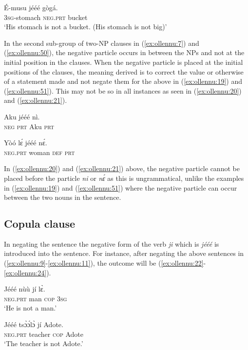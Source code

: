 \documentclass[output=paper,newtxmath,modfonts,nonflat,draftmode]{langsci/langscibook}
\begin{document}
\ea \label{ex:ollennu:51}
\gll É-musu jééé gògá.\\
3\textsc{sg}-stomach \textsc{neg}.\textsc{prt} bucket\\
\glt 	`His stomach is not a bucket. (His stomach is not big)'
\z


In the second sub-group of two-NP clauses in (\ref{ex:ollennu:7}) and (\ref{ex:ollennu:50}), the {negative particle} occurs in between the NPs and not at the initial position in the clauses. When the {negative particle} is placed at the initial positions of the clauses, the meaning derived is to correct the value or otherwise of a statement made and not negate them for the above in (\ref{ex:ollennu:19}) and (\ref{ex:ollennu:51}). This may not be so in all instances as seen in (\ref{ex:ollennu:20}) and (\ref{ex:ollennu:21}).

\ea \label{ex:ollennu:20}
\gll * Aku jééé nì. \\
{} \textsc{neg} \textsc{prt} Aku \textsc{prt}\\
\z

\ea \label{ex:ollennu:21}
\gll * Yòó l\'ɛ jééé n\'ɛ.\\
{} \textsc{neg}.\textsc{prt} woman \textsc{def} \textsc{prt}\\
\z


In (\ref{ex:ollennu:20}) and (\ref{ex:ollennu:21}) above, the {negative particle} cannot be placed before the particle \textit{ni} or \textit{n\'ɛ} as this is ungrammatical, unlike the examples in (\ref{ex:ollennu:19}) and (\ref{ex:ollennu:51}) where the {negative particle} can occur between the two nouns in the sentence.

\subsection{\label{sec:ollennu:2.2} Copula clause}

In negating the  sentence the negative form of the  verb \textit{ji} which is \textit{jééé} is introduced into the sentence. For instance, after negating the above  sentences in (\ref{ex:ollennu:9}-\ref{ex:ollennu:11}), the outcome will be (\ref{ex:ollennu:22}-\ref{ex:ollennu:24}).

\ea \label{ex:ollennu:22}
\gll Jééé nùù jí l\`ɛ.\\
\textsc{neg}.\textsc{prt} man \textsc{cop} 3\textsc{sg}\\
\glt `He is not a man.'
\z

\ea \label{ex:ollennu:23}
\gll Jééé ts\`ɔ\'ɔl\`ɔ jí Adote.\\
\textsc{neg}.\textsc{prt} teacher \textsc{cop} Adote\\
\glt `The teacher is not Adote.'
\z
\end{document}
